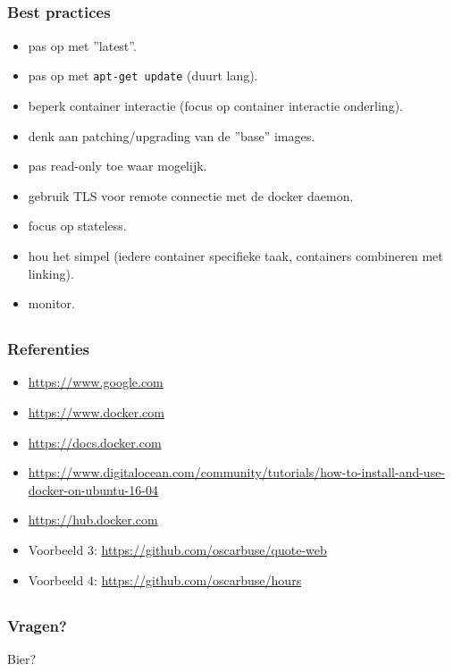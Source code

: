 \subsection{}
\begin{styleframefrag}
    \frametitle{Best practices}
\begin{itemize}
	\item pas op met ''latest''.
	\pause
	\item pas op met \verb!apt-get update! (duurt lang).
	\pause
	\item beperk container interactie (focus op container interactie onderling).
	\pause
	\item denk aan patching/upgrading van de ''base'' images.
	\pause
	\item pas read-only toe waar mogelijk.
	\pause
	\item gebruik TLS voor remote connectie met de docker daemon.
	\pause
	\item focus op stateless.
	\pause
	\item hou het simpel (iedere container specifieke taak, containers combineren met linking).
	\pause
	\item monitor.
\end{itemize}
\end{styleframefrag}

\subsection{}
\begin{styleframe}
    \frametitle{Referenties}
\begin{itemize}
	\item \url{https://www.google.com}
	\item \url{https://www.docker.com}
	\item \url{https://docs.docker.com}
	\item \url{https://www.digitalocean.com/community/tutorials/how-to-install-and-use-docker-on-ubuntu-16-04}
	\item \url{https://hub.docker.com}
	\item Voorbeeld 3: \url{https://github.com/oscarbuse/quote-web}
	\item Voorbeeld 4: \url{https://github.com/oscarbuse/hours}
\end{itemize}
\end{styleframe}

\subsection{}
\begin{styleframe}
    \frametitle{Vragen?}
\begin{center}
\hspace{-20pt} \Huge Bier?
\end{center}
\end{styleframe}
